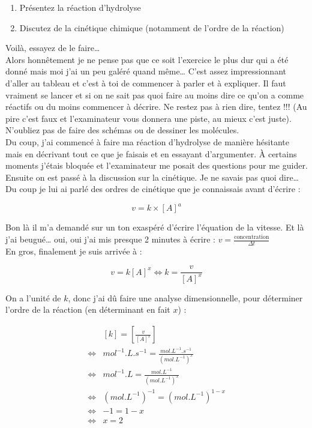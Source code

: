 \begin{enumerate}
    \item Présentez la réaction d’hydrolyse
    \item Discutez de la cinétique chimique (notamment de l’ordre de la réaction)
\end{enumerate}

\hrulefill

Voilà, essayez de le faire…\\

Alors honnêtement je ne pense pas que ce soit l’exercice le plus dur qui a été donné mais moi j’ai un peu galéré quand même… C’est assez impressionnant d’aller au tableau et c’est à toi de commencer à parler et à expliquer. Il faut vraiment se lancer et si on ne sait pas quoi faire au moins dire ce qu’on a comme réactifs ou du moins commencer à décrire. Ne restez pas à rien dire, tentez !!! (Au pire c’est faux et l’examinateur vous donnera une piste, au mieux c’est juste). N’oubliez pas de faire des schémas ou de dessiner les molécules.\\

Du coup, j’ai commencé à faire ma réaction d’hydrolyse de manière hésitante mais en décrivant tout ce que je faisais et en essayant d’argumenter. À certains moments j’étais bloquée et l’examinateur me posait des questions pour me guider.\\

Ensuite on est passé à la discussion sur la cinétique. Je ne savais pas quoi dire… Du coup je lui ai parlé des ordres de cinétique que je connaissais avant d’écrire :

$$
v=k\times [A]^a
$$

Bon là il m’a demandé sur un ton exaspéré d’écrire l’équation de la vitesse. Et là j’ai beugué… oui, oui j’ai mis presque 2 minutes à écrire : $v=\frac{\text{concentration}}{\Delta t}$\\

En gros, finalement je suis arrivée à :

$$
v = k[A]^x\iff k=\frac{v}{[A]^x}
$$

On a l'unité de $k$, donc j'ai dû faire une analyse dimensionnelle, pour déterminer l'ordre de la réaction (en déterminant en fait $x$) :

$$
\begin{aligned}
&[k]=\left[\frac{v}{[A]^x}\right]\\
\iff&mol^{-1}.L.s^{-1}=\frac{mol.L^{-1}.s^{-1}}{(mol.L^{-1})^x}\\
\iff &mol^{-1}.L=\frac{mol.L^{-1}}{\left(mol.L^{-1}\right)^x}\\
\iff &\left(mol.L^{-1}\right)^{-1}=\left(mol.L^{-1}\right)^{1-x}\\
\iff &-1=1-x\\
\iff &x=2
\end{aligned}
$$


